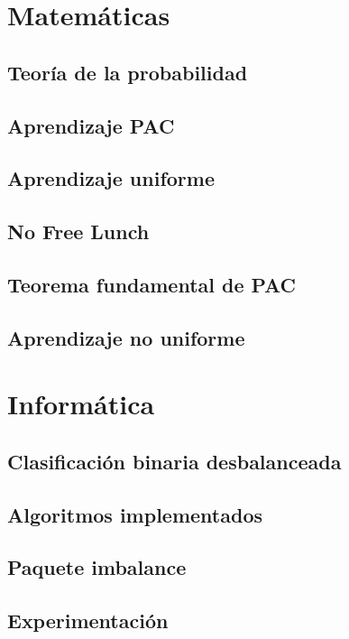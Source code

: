 \documentclass[oneside,openany,titlepage,dottedtoc,headinclude,%
               footinclude=true,cleardoublepage=empty,abstractoff, %
               paper=a4,fontsize=11pt,%
               ]{scrreprt}
\begin{document}
\part{Matemáticas}  
  \chapter{Teoría de la probabilidad}
    
  \chapter{Aprendizaje PAC}
    
    
  \chapter{Aprendizaje uniforme}
    
  \chapter{No Free Lunch}
    
  \chapter{Teorema fundamental de PAC}
    
  \chapter{Aprendizaje no uniforme}
    
  
\part{Informática}
  \chapter{Clasificación binaria desbalanceada}
    
  \chapter{Algoritmos implementados}
    
    
    
    
    
  \chapter{Paquete imbalance}
    
  \chapter{Experimentación}
    
\end{document}
